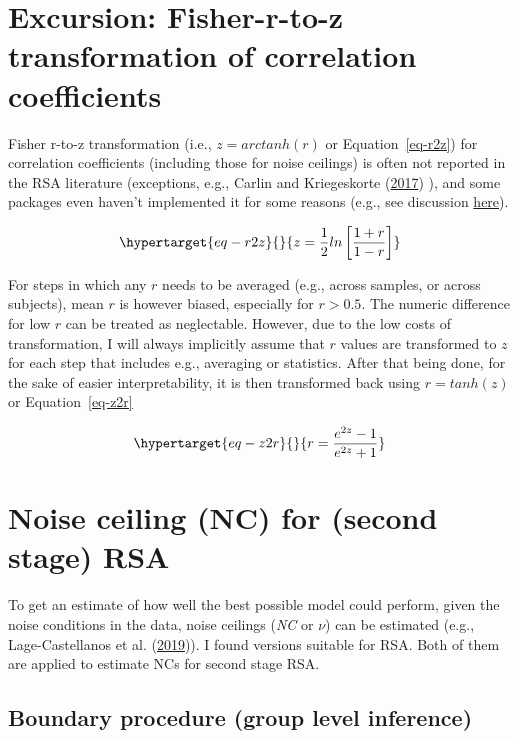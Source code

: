 \documentclass[
  letterpaper,
  DIV=11,
  numbers=noendperiod]{scrartcl}
\begin{document}
\hypertarget{sec-Fisher}{%
\section{Excursion: Fisher-r-to-z transformation of correlation
coefficients}\label{sec-Fisher}}

Fisher r-to-z transformation (i.e., \(z=arctanh(r)\) or
Equation~\ref{eq-r2z}) for correlation coefficients (including those for
noise ceilings) is often not reported in the RSA literature (exceptions,
e.g., Carlin and Kriegeskorte (\protect\hyperlink{ref-carlin2017}{2017})
), and some packages even haven't implemented it for some reasons (e.g.,
see discussion
\href{https://github.com/rsagroup/rsatoolbox/issues/370}{here}).

\begin{equation}\protect\hypertarget{eq-r2z}{}{
z = \frac{1}{2} ln \left[  \dfrac{1+r}{1-r} \right]
}\label{eq-r2z}\end{equation}

For steps in which any \(r\) needs to be averaged (e.g., across samples,
or across subjects), mean \(r\) is however biased, especially for
\(r > 0.5\). The numeric difference for low \(r\) can be treated as
neglectable. However, due to the low costs of transformation, I will
always implicitly assume that \(r\) values are transformed to \(z\) for
each step that includes e.g., averaging or statistics. After that being
done, for the sake of easier interpretability, it is then transformed
back using \(r = tanh(z)\) or Equation~\ref{eq-z2r}

\begin{equation}\protect\hypertarget{eq-z2r}{}{
r = \dfrac{e^{2z}-1}{e^{2z}+1}
}\label{eq-z2r}\end{equation}

\hypertarget{sec-NC-RSA}{%
\section{Noise ceiling (NC) for (second stage) RSA}\label{sec-NC-RSA}}

To get an estimate of how well the best possible model could perform,
given the noise conditions in the data, noise ceilings (\emph{NC} or
\(\nu\)) can be estimated (e.g., Lage-Castellanos et al.
(\protect\hyperlink{ref-lage-castellanos2019}{2019})). I found versions
suitable for RSA. Both of them are applied to estimate NCs for second
stage RSA.

\hypertarget{sec-NCbound-RSA}{%
\subsection{Boundary procedure (group level
inference)}\label{sec-NCbound-RSA}}
\end{document}
